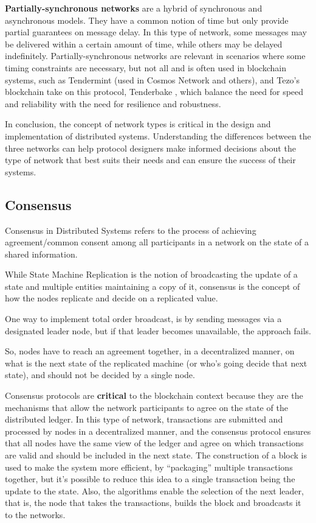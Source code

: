 \textbf{Partially-synchronous networks} \cite{dwork1988consensus} are a hybrid of synchronous and asynchronous models.
They have a common notion of time but only provide partial guarantees on message delay. In this type of network, some messages may be delivered within a certain amount of time, while others may be delayed indefinitely. Partially-synchronous networks are relevant in scenarios where some timing constraints are necessary, but not all and is often used in blockchain systems, such as Tendermint \cite{buchman2016tendermint}(used in Cosmos Network \cite{tendermintinc}and others), and Tezo's blockchain take on this protocol, Tenderbake \cite{acstefanoaei2020tenderbake}, which balance the need for speed and reliability with the need for resilience and robustness.

In conclusion, the concept of network types is critical in the design and implementation of distributed systems. Understanding the differences between the three networks can help protocol designers make informed decisions about the type of network that best suits their needs and can ensure the success of their systems.

\subsection*{\textbf{Consensus}}
Consensus in Distributed Systems refers to the process of achieving agreement/common consent among all participants in a network on the state of a shared information.

While State Machine Replication is the notion of broadcasting the update of a state and multiple entities maintaining a copy of it, consensus is the concept of how the nodes replicate and decide on a replicated value.

One way to implement total order broadcast, is by sending messages via a designated leader node, but if that leader becomes unavailable, the approach fails. 

So, nodes have to reach an agreement together, in a decentralized manner, on what is the next state of the replicated machine (or who's going decide that next state), and should not be decided by a single node.

Consensus protocols are \textbf{critical} to the blockchain context because they are the mechanisms that allow the network participants to agree on the state of the distributed ledger. In this type of network, transactions are submitted and processed by nodes in a decentralized manner, and the consensus protocol ensures that all nodes have the same view of the ledger and agree on which transactions are valid and should be included in the next state.
The construction of a block is used to make the system more efficient, by ``packaging'' multiple transactions together, but it's possible to reduce this idea to a single transaction being the update to the state.
Also, the algorithms enable the selection of the next leader, that is, the node that takes the transactions, builds the block and broadcasts it to the networks. 

